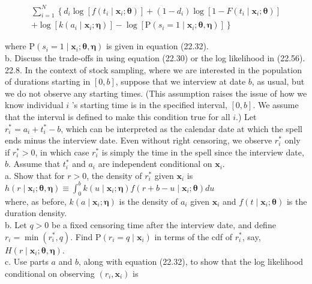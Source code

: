 \documentclass[10pt]{article}
\begin{document}
\begin{gather*}
\sum_{i=1}^{N}\left\{d_{i} \log \left[f\left(t_{i} \mid \mathbf{x}_{i} ; \boldsymbol{\theta}\right)\right]+\left(1-d_{i}\right) \log \left[1-F\left(t_{i} \mid \mathbf{x}_{i} ; \boldsymbol{\theta}\right)\right]\right. \\
\left.+\log \left[k\left(a_{i} \mid \mathbf{x}_{i} ; \boldsymbol{\eta}\right)\right]-\log \left[\mathrm{P}\left(s_{i}=1 \mid \mathbf{x}_{i} ; \boldsymbol{\theta}, \boldsymbol{\eta}\right)\right]\right\} \tag{22.56}
\end{gather*}


where $\mathrm{P}\left(s_{i}=1 \mid \mathbf{x}_{i} ; \boldsymbol{\theta}, \boldsymbol{\eta}\right)$ is given in equation (22.32).\\
b. Discuss the trade-offs in using equation (22.30) or the log likelihood in (22.56).\\
22.8. In the context of stock sampling, where we are interested in the population of durations starting in $[0, b]$, suppose that we interview at date $b$, as usual, but we do not observe any starting times. (This assumption raises the issue of how we know individual $i$ 's starting time is in the specified interval, $[0, b]$. We assume that the interval is defined to make this condition true for all $i$.) Let $r_{i}^{*}=a_{i}+t_{i}^{*}-b$, which can be interpreted as the calendar date at which the spell ends minus the interview date. Even without right censoring, we observe $r_{i}^{*}$ only if $r_{i}^{*}>0$, in which case $r_{i}^{*}$ is simply the time in the spell since the interview date, $b$. Assume that $t_{i}^{*}$ and $a_{i}$ are independent conditional on $\mathbf{x}_{i}$.\\
a. Show that for $r>0$, the density of $r_{i}^{*}$ given $\mathbf{x}_{i}$ is\\
$h\left(r \mid \mathbf{x}_{i} ; \boldsymbol{\theta}, \boldsymbol{\eta}\right) \equiv \int_{0}^{b} k\left(u \mid \mathbf{x}_{i} ; \boldsymbol{\eta}\right) f\left(r+b-u \mid \mathbf{x}_{i} ; \boldsymbol{\theta}\right) d u$\\
where, as before, $k\left(a \mid \mathbf{x}_{i} ; \boldsymbol{\eta}\right)$ is the density of $a_{i}$ given $\mathbf{x}_{i}$ and $f\left(t \mid \mathbf{x}_{i} ; \boldsymbol{\theta}\right)$ is the duration density.\\
b. Let $q>0$ be a fixed censoring time after the interview date, and define $r_{i}= \min \left(r_{i}^{*}, q\right)$. Find $\mathrm{P}\left(r_{i}=q \mid \mathbf{x}_{i}\right)$ in terms of the cdf of $r_{i}^{*}$, say, $H\left(r \mid \mathbf{x}_{i} ; \boldsymbol{\theta}, \boldsymbol{\eta}\right)$.\\
c. Use parts $a$ and $b$, along with equation (22.32), to show that the log likelihood conditional on observing $\left(r_{i}, \mathbf{x}_{i}\right)$ is
\end{document}

